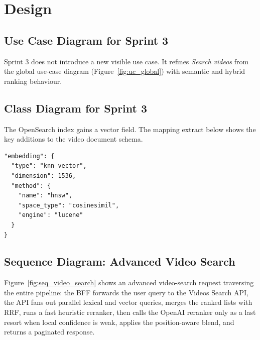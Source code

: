 \section{Design}

\subsection{Use Case Diagram for Sprint 3}

Sprint 3 does not introduce a new visible use case. It refines \emph{Search videos} from the
global use-case diagram (Figure~\ref{fig:uc_global}) with semantic and hybrid ranking behaviour.

\subsection{Class Diagram for Sprint 3}

The OpenSearch index gains a vector field. The mapping extract below shows the key additions
to the video document schema.

\begin{lstlisting}[caption={kNN field addition to the OpenSearch video mapping}]
"embedding": {
  "type": "knn_vector",
  "dimension": 1536,
  "method": {
    "name": "hnsw",
    "space_type": "cosinesimil",
    "engine": "lucene"
  }
}
\end{lstlisting}

\subsection{Sequence Diagram: Advanced Video Search}

Figure~\ref{fig:seq_video_search} shows an advanced video-search request traversing the entire
pipeline: the BFF forwards the user query to the Videos Search API, the API fans out parallel
lexical and vector queries, merges the ranked lists with RRF, runs a fast heuristic reranker,
then calls the OpenAI reranker only as a last resort when local confidence is weak, applies the
position-aware blend, and returns a paginated response.

